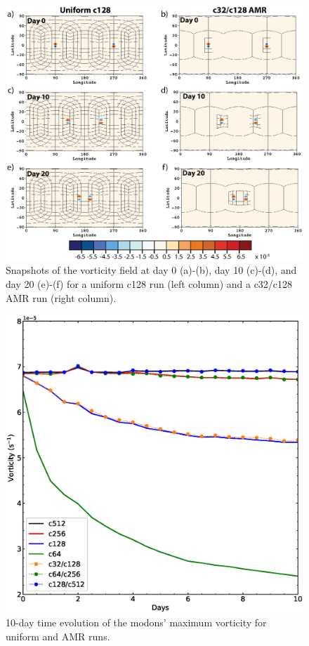 \begin{figure}
    \centerline{%
    \noindent
    \includegraphics[width=\textwidth]{Chap3/modon_vortex_compare-01.eps}}
    \caption{Snapshots of the vorticity field at day 0 (a)-(b), day 10 (c)-(d),
    and day 20 (e)-(f) for a uniform c128 run (left column) and a c32/c128 AMR
    run (right column).
}%
    \label{fig:modonvortplot}
\end{figure}

\begin{figure}
    \centerline{%
    \noindent
    \includegraphics[width=\textwidth]{Chap3/modon_maxvort.eps}}
    \caption{10-day time evolution of the modons' maximum 
    vorticity for uniform and AMR runs.
}%
    \label{fig:modontevol}
\end{figure}

